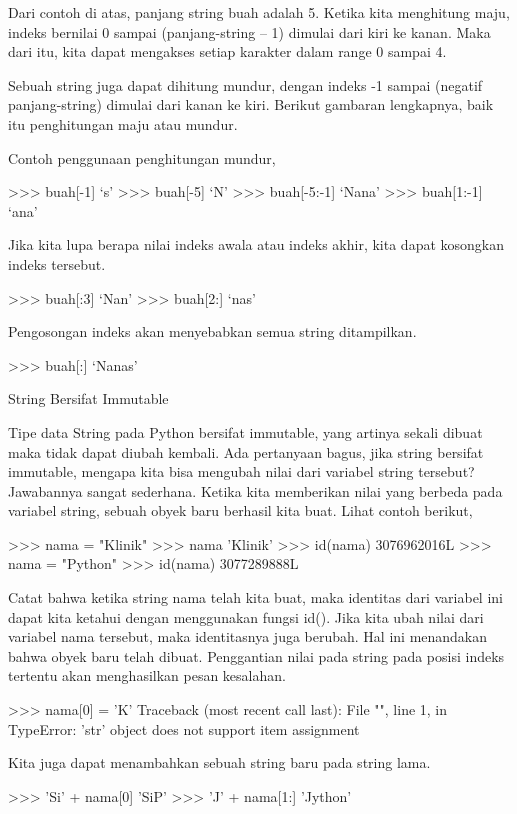 Dari contoh di atas, panjang string buah adalah 5. Ketika kita menghitung maju, indeks bernilai 0 sampai (panjang-string – 1) dimulai dari kiri ke kanan. Maka dari itu, kita dapat mengakses setiap karakter dalam range 0 sampai 4.

Sebuah string juga dapat dihitung mundur, dengan indeks -1 sampai (negatif panjang-string) dimulai dari kanan ke kiri. Berikut gambaran lengkapnya, baik itu penghitungan maju atau mundur.

Contoh penggunaan penghitungan mundur,

>>> buah[-1]
‘s’
>>> buah[-5]
‘N’
>>> buah[-5:-1]
‘Nana’
>>> buah[1:-1]
‘ana’

Jika kita lupa berapa nilai indeks awala atau indeks akhir, kita dapat kosongkan indeks tersebut.

>>> buah[:3]
‘Nan’
>>> buah[2:]
‘nas’

Pengosongan indeks akan menyebabkan semua string ditampilkan.

>>> buah[:]
‘Nanas’

String Bersifat Immutable

Tipe data String pada Python bersifat immutable, yang artinya sekali dibuat maka tidak dapat diubah kembali. Ada pertanyaan bagus, jika string bersifat immutable, mengapa kita bisa mengubah nilai dari variabel string tersebut? Jawabannya sangat sederhana. Ketika kita memberikan nilai yang berbeda pada variabel string, sebuah obyek baru berhasil kita buat. Lihat contoh berikut,

>>> nama = "Klinik"
>>> nama
'Klinik'
>>> id(nama)
3076962016L
>>> nama = "Python"
>>> id(nama)
3077289888L

Catat bahwa ketika string nama telah kita buat, maka identitas dari variabel ini dapat kita ketahui dengan menggunakan fungsi id(). Jika kita ubah nilai dari variabel nama tersebut, maka identitasnya juga berubah. Hal ini menandakan bahwa obyek baru telah dibuat. Penggantian nilai pada string pada posisi indeks tertentu akan menghasilkan pesan kesalahan.

>>> nama[0] = 'K'
Traceback (most recent call last):
File "", line 1, in
TypeError: 'str' object does not support item assignment

Kita juga dapat menambahkan sebuah string baru pada string lama.

>>> 'Si' + nama[0]
'SiP'
>>> 'J' + nama[1:]
'Jython'

